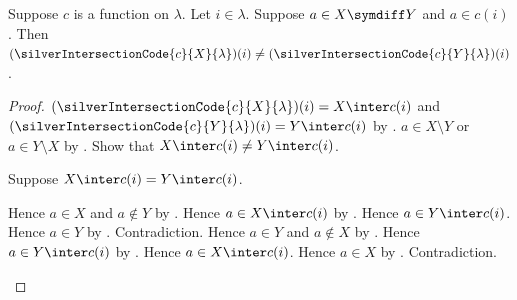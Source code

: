 \begin{proposition}\label{silver_intersection_codes_differ_at}
    Suppose $c$ is a function on $\lambda$.
    Let $i\in\lambda$.
    Suppose $a\in X\symdiff Y$ and $a\in c(i)$.
    Then $(\silverIntersectionCode{c}{X}{\lambda})(i)
        \neq(\silverIntersectionCode{c}{Y}{\lambda})(i)$.
\end{proposition}
\begin{proof}
    $(\silverIntersectionCode{c}{X}{\lambda})(i)=X\inter c(i)$ and
        $(\silverIntersectionCode{c}{Y}{\lambda})(i)=Y\inter c(i)$
        by .
    $a\in X\setminus Y$ or $a\in Y\setminus X$
        by .
    Show that $X\inter c(i)\neq Y\inter c(i)$.
    \begin{subproof}
        Suppose $X\inter c(i)=Y\inter c(i)$.
        \begin{byCase}
                Hence $a\in X$ and $a\notin Y$ by .
                Hence $a\in X\inter c(i)$ by .
                Hence $a\in Y\inter c(i)$.
                Hence $a\in Y$ by .
                Contradiction.
                Hence $a\in Y$ and $a\notin X$ by .
                Hence $a\in Y\inter c(i)$ by .
                Hence $a\in X\inter c(i)$.
                Hence $a\in X$ by .
                Contradiction.
        \end{byCase}
    \end{subproof}
\end{proof}

